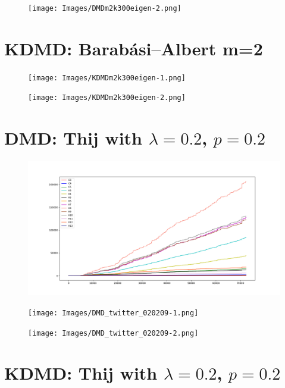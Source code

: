 \begin{figure}
    \texttt{[image: Images/DMDm2k300eigen-2.png]}
    \centering
\end{figure}

\clearpage

\section{KDMD: Barabási–Albert m=2}

\begin{figure}
    \texttt{[image: Images/KDMDm2k300eigen-1.png]}
    \centering
\end{figure}

\begin{figure}
    \texttt{[image: Images/KDMDm2k300eigen-2.png]}
    \centering
\end{figure}

\clearpage

\section{DMD: Thij with $\lambda=0.2$, $p=0.2$}
\begin{figure}
    \includegraphics[width=12cm]{Images/twitter_counts_020209.png}
    \centering
\end{figure}


\begin{figure}
    \texttt{[image: Images/DMD\_twitter\_020209-1.png]}
    \centering
\end{figure}

\begin{figure}
    \texttt{[image: Images/DMD\_twitter\_020209-2.png]}
    \centering
\end{figure}

\section{KDMD: Thij with $\lambda=0.2$, $p=0.2$}

